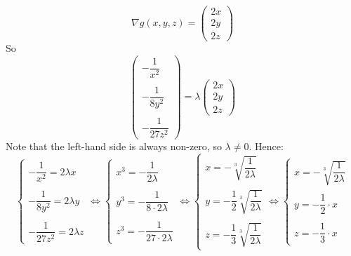 \documentclass[a4paper,10pt]{article}
\begin{document}
\[
    \nabla g(x,y,z) = \begin{pmatrix}
        2x \\ 2y \\ 2z
    \end{pmatrix}
\]
So
\[
    \begin{pmatrix}
        -\dfrac{1}{x^2} \\ \\ -\dfrac{1}{8y^2} \\ \\ -\dfrac{1}{27z^2}
    \end{pmatrix}
    = \lambda
    \begin{pmatrix}
        2x \\ 2y\\ 2z
    \end{pmatrix}
\]
Note that the left-hand side is always non-zero, so $\lambda \neq 0$. Hence:
\[
    \begin{cases}
        -\dfrac{1}{x^2} = 2\lambda x  \\ \\
        -\dfrac{1}{8y^2} = 2\lambda y \\ \\
        -\dfrac{1}{27z^2} = 2\lambda z
    \end{cases} \iff
    \begin{cases}
        x^3 = -\dfrac{1}{2\lambda}       \\ \\
        y^3 = -\dfrac{1}{8\cdot2\lambda} \\ \\
        z^3 = -\dfrac{1}{27\cdot 2\lambda}
    \end{cases} \iff
    \begin{cases}
        x = -\sqrt[3]{\dfrac{1}{2\lambda}}             \\ \\
        y = -\dfrac{1}{2}\sqrt[3]{\dfrac{1}{2\lambda}} \\ \\
        z = -\dfrac{1}{3}\sqrt[3]{\dfrac{1}{2\lambda}}
    \end{cases} \iff
    \begin{cases}
        x = -\sqrt[3]{\dfrac{1}{2\lambda}} \\ \\
        y = -\dfrac{1}{2} \cdot x          \\ \\
        z = -\dfrac{1}{3} \cdot x
    \end{cases}
\]
\end{document}
